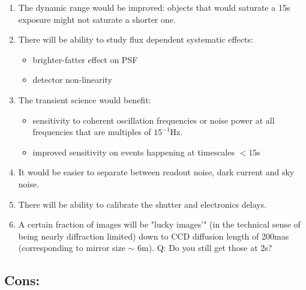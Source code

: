 \documentclass[12pt, a4paper]{article}
\begin{document}
\begin{enumerate}
\item The  dynamic range would be improved: objects that would saturate a 15s
  exposure might not saturate a shorter one.

\item There will be ability to study flux dependent systematic effects:
  \begin{itemize}
  \item brighter-fatter effect on PSF
  \item detector non-linearity
  \end{itemize}

\item The transient science would benefit:
  \begin{itemize}
  \item sensitivity to coherent oscillation frequencies or noise power at all
    frequencies that are multiples  of $15^{-1}$Hz.
  \item improved sensitivity on events happening at timescales $<15$s 
  \end{itemize}

\item It would be easier to separate between readout noise, dark
  current and sky noise.

\item There will be ability to calibrate the shutter and electronics delays.

\item A certain fraction of images will be "lucky images'" (in the
  technical sense of being nearly diffraction limited) down to
  CCD diffusion length of 200mas (corresponding to mirror size $\sim$
  6m). Q: Do you still get those at 2s?

\end{enumerate}

\subsection*{Cons:}
\end{document}
